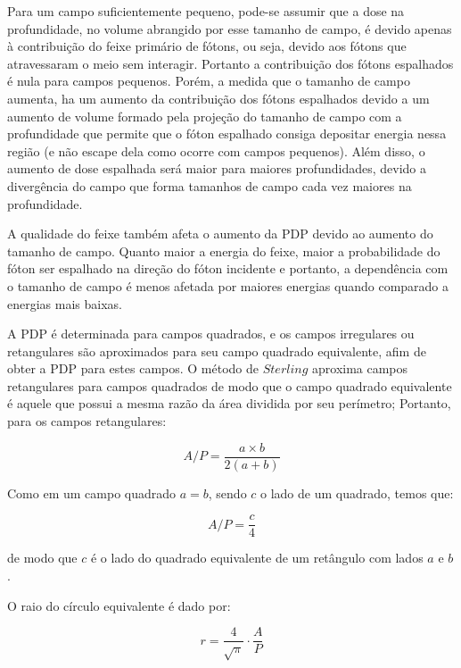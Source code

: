 \documentclass[11pt,a4paper]{article}
\begin{document}
	Para um campo suficientemente pequeno, pode-se assumir que a dose na profundidade, no volume abrangido por esse tamanho de campo, é devido apenas à contribuição do feixe primário de fótons, ou seja, devido aos fótons que atravessaram o meio sem interagir. Portanto a contribuição dos fótons espalhados é nula para campos pequenos. Porém, a medida que o tamanho de campo aumenta, ha um aumento da contribuição dos fótons espalhados devido a um aumento de volume formado pela projeção do tamanho de campo com a profundidade que permite que o fóton espalhado consiga depositar energia nessa região (e não escape dela como ocorre com campos pequenos). Além disso, o aumento de dose espalhada será maior para maiores profundidades, devido a divergência do campo que forma tamanhos de campo cada vez maiores na profundidade.

	A qualidade do feixe também afeta o aumento da PDP devido ao aumento do tamanho de campo. Quanto maior a energia do feixe, maior a probabilidade do fóton ser espalhado na direção do fóton incidente e portanto, a dependência com o tamanho de campo é menos afetada por maiores energias quando comparado a energias mais baixas.

	A PDP é determinada para campos quadrados, e os campos irregulares ou retangulares são aproximados para seu campo quadrado equivalente, afim de obter a PDP para estes campos. O método de $Sterling$ aproxima campos retangulares para campos quadrados de modo que o campo quadrado equivalente é aquele que possui a mesma razão da área dividida por seu perímetro; Portanto, para os campos retangulares:

	\begin{equation}
		A/P = \frac{a \times b}{2(a + b)}
	\end{equation}

	Como em um campo quadrado $a = b$, sendo $c$ o lado de um quadrado, temos que:

	\begin{equation}
		A/P = \frac{c}{4}
		\label{eq:quadradoEquivalente}
	\end{equation}

	de modo que $c$ é o lado do quadrado equivalente de um retângulo com lados $a$ e $b$.

	O raio do círculo equivalente é dado por:

	\begin{equation}
		r = \frac{4}{\sqrt{\pi}} \cdot \frac{A}{P}
		\label{eq:raioEquivalente}
	\end{equation}
\end{document}

